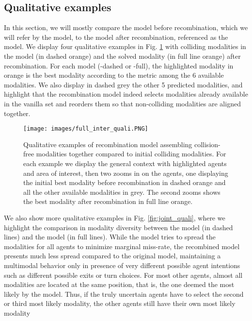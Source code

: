 \documentclass{article} \usepackage{iclr2022_conference,times}
\begin{document}
\subsection{Qualitative examples}



In this section, we will mostly compare the model before recombination, which we will refer by the  model, to the model after recombination, referenced as the  model.
We display four qualitative examples in Fig. \ref{fig:inter_quali} with colliding modalities in the  model (in dashed orange) and the solved modality (in full line orange) after recombination. For each model (-dashed or -full), the highlighted modality in orange is the best modality according to the  metric among the 6 available modalities. We also display in dashed grey the other 5 predicted  modalities, and highlight that the recombination model indeed selects modalities already available in the vanilla set and reorders them so that non-colliding modalities are aligned together. 
\begin{figure}[h]
\centerline{\texttt{[image: images/full\_inter\_quali.PNG]}}
\caption{Qualitative examples of recombination model assembling collision-free modalities together compared to initial colliding modalities. For each example we display the general context with highlighted agents and area of interest, then two zooms in on the agents, one displaying the initial best modality before recombination in dashed orange and all the other available modalities in grey. The second zooms shows the best modality after recombination in full line orange. }
\label{fig:inter_quali}
\end{figure}


We also show more qualitative examples in Fig. \ref{fig:joint_quali}, where we highlight the comparison in modality diversity between the  model (in dashed lines) and the  model (in full lines). While the  model tries to spread the modalities for all agents to minimize marginal miss-rate, the recombined model presents much less spread compared to the original model, maintaining a multimodal behavior only in presence of very different possible agent intentions such as different possible exits or turn choices. For most other agents, almost all modalities are located at the same position, that is, the one deemed the most likely by the model. Thus, if the truly uncertain agents have to select the second or third most likely modality, the other agents still have their own most likely modality
\end{document}
